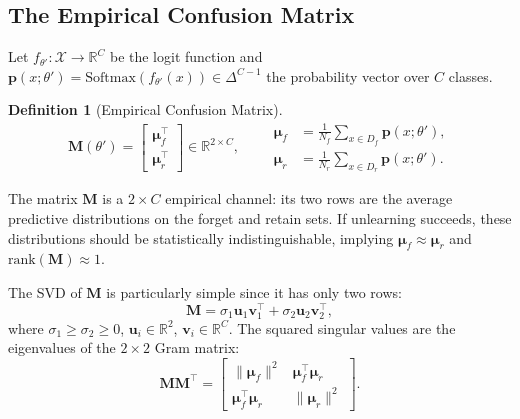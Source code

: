 \documentclass[journal]{IEEEtran}
\theoremstyle{definition}
\newtheorem{definition}[theorem]{Definition}
\begin{document}
\subsection{The Empirical Confusion Matrix}

Let $f_{\theta'}: \mathcal{X} \to \mathbb{R}^C$ be the logit function and $\mathbf{p}(x;\theta') = \mathrm{Softmax}(f_{\theta'}(x)) \in \Delta^{C-1}$ the probability vector over $C$ classes.

\begin{definition}[Empirical Confusion Matrix]
\label{def:M}
\begin{equation}
\mathbf{M}(\theta') =
\begin{bmatrix}
\boldsymbol{\mu}_f^\top \\[2pt]
\boldsymbol{\mu}_r^\top
\end{bmatrix}
\in \mathbb{R}^{2\times C},
\qquad
\begin{aligned}
\boldsymbol{\mu}_f &= \frac{1}{N_f}\sum_{x\in D_f} \mathbf{p}(x;\theta'),\\
\boldsymbol{\mu}_r &= \frac{1}{N_r}\sum_{x\in D_r} \mathbf{p}(x;\theta').
\end{aligned}
\end{equation}
\end{definition}
The matrix $\mathbf{M}$ is a $2\times C$ empirical channel: its two rows are the average predictive distributions on the forget and retain sets. If unlearning succeeds, these distributions should be statistically indistinguishable, implying $\boldsymbol{\mu}_f \approx \boldsymbol{\mu}_r$ and $\mathrm{rank}(\mathbf{M}) \approx 1$.

The SVD of $\mathbf{M}$ is particularly simple since it has only two rows:
\begin{equation}
\mathbf{M} = \sigma_1 \mathbf{u}_1 \mathbf{v}_1^\top + \sigma_2 \mathbf{u}_2 \mathbf{v}_2^\top,
\label{eq:svd_M}
\end{equation}
where $\sigma_1 \ge \sigma_2 \ge 0$, $\mathbf{u}_i \in \mathbb{R}^2$, $\mathbf{v}_i \in \mathbb{R}^C$. The squared singular values are the eigenvalues of the $2\times 2$ Gram matrix:
\begin{equation}
\mathbf{M}\mathbf{M}^\top =
\begin{bmatrix}
\|\boldsymbol{\mu}_f\|^2 & \boldsymbol{\mu}_f^\top\boldsymbol{\mu}_r \\[2pt]
\boldsymbol{\mu}_f^\top\boldsymbol{\mu}_r & \|\boldsymbol{\mu}_r\|^2
\end{bmatrix}.
\label{eq:gram}
\end{equation}
\end{document}
